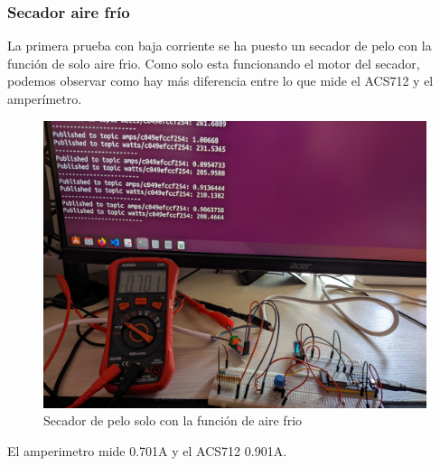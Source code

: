 \begin{titlepage}
\subsubsection{Secador aire frío}
La primera prueba con baja corriente se ha puesto un secador de pelo con la función de solo aire frio. Como solo esta funcionando el motor del secador, podemos observar como hay más diferencia entre lo que mide el ACS712 y el amperímetro. \\
\begin{figure}[h!]
	\centering
	\includegraphics[width=1\textwidth]{imagenes/AC_O_7Amps.jpg}
	\caption{Secador de pelo solo con la función de aire frio}
\end{figure}
\newpage
El amperimetro mide 0.701A y el ACS712 0.901A. \\

\end{titlepage}
